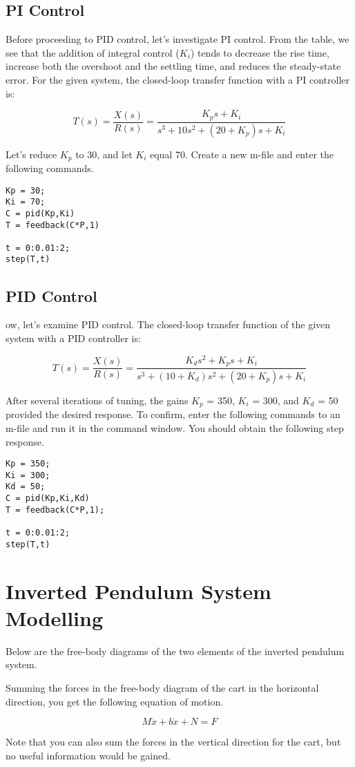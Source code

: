 \documentclass{report}
\begin{document}
\subsection{PI Control}
Before proceeding to PID control, let's investigate PI control. From the table, we see that the addition of integral control ($K_i$) tends to decrease the rise time, increase both the overshoot and the settling time, and reduces the steady-state error. For the given system, the closed-loop transfer function with a PI controller is:

\[ T(s) = \frac{X(s)}{R(s)} = \frac{K_p s + K_i}{s^3 + 10 s^2 + (20 + K_p )s + K_i} \]

Let's reduce $K_p$ to 30, and let $K_i$ equal 70. Create a new m-file and enter the following commands.
\begin{lstlisting}
Kp = 30;
Ki = 70;
C = pid(Kp,Ki)
T = feedback(C*P,1)

t = 0:0.01:2;
step(T,t)
\end{lstlisting}
\subsection{PID Control}
ow, let's examine PID control. The closed-loop transfer function of the given system with a PID controller is:

\[ T(s) = \frac{X(s)}{R(s)} = \frac{K_d s^2 + K_p s + K_i}{s^3 + (10 + K_d)s^2 + (20 + K_p)s + K_i } \]

After several iterations of tuning, the gains $K_p$ = 350, $K_i$ = 300, and $K_d$ = 50 provided the desired response. To confirm, enter the following commands to an m-file and run it in the command window. You should obtain the following step response.
\begin{lstlisting}
Kp = 350;
Ki = 300;
Kd = 50;
C = pid(Kp,Ki,Kd)
T = feedback(C*P,1);

t = 0:0.01:2;
step(T,t)
\end{lstlisting}
\section{Inverted Pendulum System Modelling}
Below are the free-body diagrams of the two elements of the inverted pendulum system.

Summing the forces in the free-body diagram of the cart in the horizontal direction, you get the following equation of motion.

$$ M\ddot{x}+b\dot{x}+N = F $$

Note that you can also sum the forces in the vertical direction for the cart, but no useful information would be gained.
\end{document}

